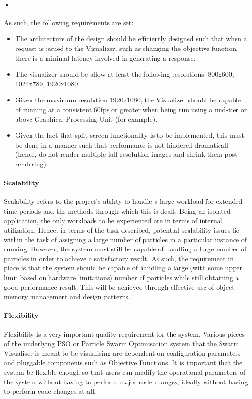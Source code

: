 \documentclass[11pt]{article}
\begin{document}
\paragraph{•}
As such, the following requirements are set:
\begin{itemize}
	\item The architecture of the design should be efficiently designed such that when a request is issued to the Visualizer, such as changing the objective function, there is a minimal latency involved in generating a response.
	\item The visualizer should be allow at least the following resolutions: 800x600, 1024x789, 1920x1080
	\item Given the maximum resolution 1920x1080, the Visualizer should be capable of running at a consistent 60fps or greater when being run using a mid-tier or above Graphical Processing Unit (for example).
	\item Given the fact that split-screen functionality is to be implemented, this must be done in a manner such that performance is not hindered dramaticall (hence, do not render multiple full resolution images and shrink them post-rendering).
\end{itemize}

\paragraph{Scalability}
Scalability refers to the project's ability to handle a large workload for extended time periods and the methods through which this is dealt. Being an isolated application, the only workloads to be experienced are in terms of internal utilization. Hence, in terms of the task described, potential scalability issues lie within the task of assigning a large number of particles in a particular instance of running. 
\newline However, the system must still be capable of handling a large number of particles in order to achieve a satisfactory result. As such, the requirement in place is that the system should be capable of handling a large (with some upper limit based on hardware limitations) number of particles while still obtaining a good performance result. This will be achieved through effective use of object memory management and design patterns.

\paragraph{Flexibility}
Flexibility is a very important quality requirement for the system. Various pieces of the underlying PSO or Particle Swarm Optimisation system that the Swarm Visualiser is meant to be visualising are dependent on configuration parameters and pluggable components such as Objective Functions. It is important that the system be flexible enough so that users can modify the operational parameters of the system without having to perform major code changes, ideally without having to perform code changes at all.
\end{document}
